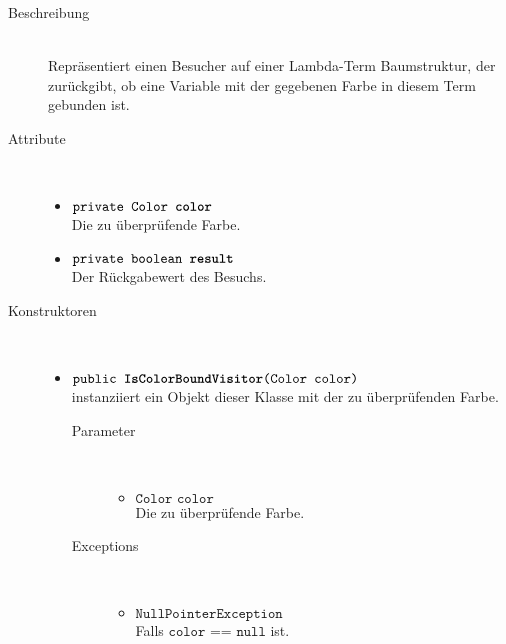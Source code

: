 \begin{description}
\item[Beschreibung] \hfill \\ Repräsentiert einen Besucher auf einer Lambda-Term Baumstruktur, der zurückgibt, ob eine Variable mit der gegebenen Farbe in diesem Term gebunden ist.

\item[Attribute] \hfill \\
	\vspace{-.8cm}
	\begin{itemize}
		\item $\texttt{private Color \textbf{color}}$ \\ Die zu überprüfende Farbe.
		\item $\texttt{private boolean \textbf{result}}$ \\ Der Rückgabewert des Besuchs.
	\end{itemize}

\item[Konstruktoren] \hfill \\
	\vspace{-.8cm}
	\begin{itemize}
		\item $\texttt{public \textbf{IsColorBoundVisitor}(Color color)}$ \\ instanziiert ein Objekt dieser Klasse mit der zu überprüfenden Farbe.
		\begin{description}
			\item[Parameter] \hfill \\
			\vspace{-.8cm}
			\begin{itemize}
				\item $\texttt{Color color}$ \\ Die zu überprüfende Farbe.
			\end{itemize}
			\item[Exceptions] \hfill \\
			\vspace{-.8cm}
			\begin{itemize}
				\item $\texttt{NullPointerException}$ \\ Falls $\texttt{color == null}$ ist.
			\end{itemize}
		\end{description}
	\end{itemize}


\end{description}
